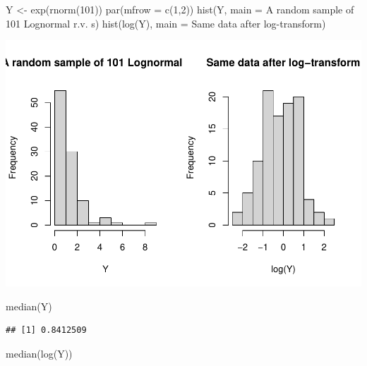 \documentclass[
]{book}
\newenvironment{Shaded}{\begin{snugshade}}{\end{snugshade}}
\newcommand{\AttributeTok}[1]{\textcolor[rgb]{0.77,0.63,0.00}{#1}}
\newcommand{\DecValTok}[1]{\textcolor[rgb]{0.00,0.00,0.81}{#1}}
\newcommand{\FunctionTok}[1]{\textcolor[rgb]{0.00,0.00,0.00}{#1}}
\newcommand{\NormalTok}[1]{#1}
\newcommand{\OtherTok}[1]{\textcolor[rgb]{0.56,0.35,0.01}{#1}}
\newcommand{\StringTok}[1]{\textcolor[rgb]{0.31,0.60,0.02}{#1}}
\begin{document}
\begin{Shaded}
\begin{Highlighting}[]
\NormalTok{Y }\OtherTok{\textless{}{-}} \FunctionTok{exp}\NormalTok{(}\FunctionTok{rnorm}\NormalTok{(}\DecValTok{101}\NormalTok{))}
\FunctionTok{par}\NormalTok{(}\AttributeTok{mfrow =} \FunctionTok{c}\NormalTok{(}\DecValTok{1}\NormalTok{,}\DecValTok{2}\NormalTok{))}
\FunctionTok{hist}\NormalTok{(Y, }\AttributeTok{main =} \StringTok{\textquotesingle{}A random sample of 101 Lognormal r.v. s\textquotesingle{}}\NormalTok{)}
\FunctionTok{hist}\NormalTok{(}\FunctionTok{log}\NormalTok{(Y), }\AttributeTok{main =} \StringTok{\textquotesingle{}Same data after log{-}transform\textquotesingle{}}\NormalTok{)}
\end{Highlighting}
\end{Shaded}

\includegraphics{04-Non-Normal-Responses_files/figure-latex/unnamed-chunk-1-1.pdf}

\begin{Shaded}
\begin{Highlighting}[]
\FunctionTok{median}\NormalTok{(Y)}
\end{Highlighting}
\end{Shaded}

\begin{verbatim}
## [1] 0.8412509
\end{verbatim}

\begin{Shaded}
\begin{Highlighting}[]
\FunctionTok{median}\NormalTok{(}\FunctionTok{log}\NormalTok{(Y))}
\end{Highlighting}
\end{Shaded}
\end{document}
